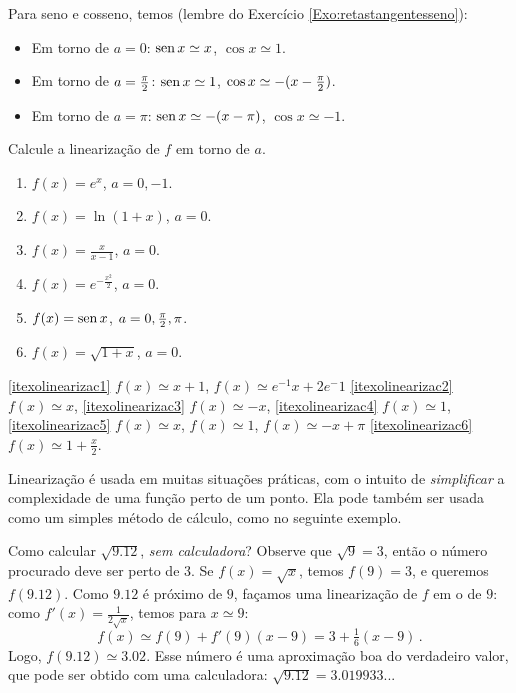 \begin{ex} Para seno e cosseno, temos (lembre do Exercício
\ref{Exo:retastangentesseno}):
\begin{itemize}
 \item 
Em torno de $a=0$: $\operatorname{sen} x\simeq x $,  $\cos x\simeq 1$.
\item Em torno de $a=\tfrac{\pi}{2}$:
$\operatorname{sen} x\simeq 1$, $\cos x\simeq -(x-\tfrac{\pi}{2})$.
\item Em torno de $a=\pi$: $\operatorname{sen} x\simeq -(x-\pi)$, $\cos x \simeq -1$.
\end{itemize}
\end{ex}

\begin{exo}
Calcule a linearização de $f$ em torno de $a$.
\begin{multicols}{2}
\begin{enumerate}
\item\label{itexolinearizac1} $f(x)=e^x$, $a=0,-1$.
\item\label{itexolinearizac2} $f(x)=\ln(1+x)$, $a=0$.
\item\label{itexolinearizac3} $f(x)=\frac{x}{x-1}$, $a=0$.
\item\label{itexolinearizac4} $f(x)=e^{-\frac{x^2}{2}}$, $a=0$.
\item\label{itexolinearizac5} $f(x)=\operatorname{sen} x$, $a=0,\tfrac{\pi}{2}, \pi$.
\item\label{itexolinearizac6} $f(x)=\sqrt{1+x}$, $a=0$.
\end{enumerate}
\end{multicols}
\vspace{0.01cm}
\begin{sol}
\eqref{itexolinearizac1} $f(x)\simeq x+1$, $f(x)\simeq e^{-1}x+2e{^-1}$
\eqref{itexolinearizac2} $f(x)\simeq x$,
\eqref{itexolinearizac3} $f(x)\simeq -x$,
\eqref{itexolinearizac4} $f(x)\simeq 1$,
\eqref{itexolinearizac5} $f(x)\simeq x$, $f(x)\simeq 1$, $f(x)\simeq -x+\pi$
\eqref{itexolinearizac6} $f(x)\simeq 1+\frac{x}{2}$.
\end{sol}
\end{exo}

Linearização é usada em muitas situações práticas, com o intuito de
\emph{simplificar} a complexidade de uma função perto de um ponto. Ela pode
também ser usada como um simples método de cálculo, como no seguinte exemplo.

\begin{ex}
Como calcular $\sqrt{9.12}$, \emph{sem calculadora}?
Observe que $\sqrt{9}=3$, então o número procurado deve ser perto de $3$. Se
$f(x)=\sqrt{x}$, temos $f(9)=3$, e queremos $f(9.12)$. Como $9.12$ é próximo de
$9$, façamos uma linearização de $f$ em o de $9$: como
$f'(x)=\frac{1}{2\sqrt{x}}$, temos para $x\simeq 9$:
$$f(x)\simeq f(9)+f'(9)(x-9)=3+\tfrac16(x-9)\,.$$
Logo, $f(9.12)\simeq 3.02$. 
Esse número é uma aproximação boa do verdadeiro valor, que pode ser obtido com
uma calculadora: $\sqrt{9.12}=3.019933...$
\end{ex}

